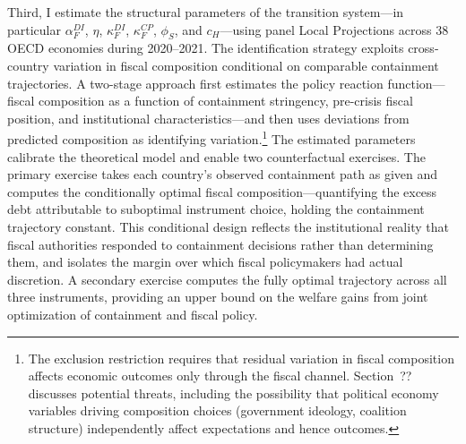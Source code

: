 Third, I estimate the structural parameters of the transition system---in particular
$\alpha_F^{DI}$, $\eta$, $\kappa_F^{DI}$, $\kappa_F^{CP}$, $\phi_S$, and
$c_H$---using panel Local Projections \citep{jorda2005, jorda2025} across 38 OECD
economies during 2020--2021. The identification strategy exploits cross-country
variation in fiscal composition conditional on comparable containment trajectories. A
two-stage approach first estimates the policy reaction function---fiscal composition
as a function of containment stringency, pre-crisis fiscal position, and institutional
characteristics---and then uses deviations from predicted composition as identifying
variation.\footnote{The exclusion restriction requires that residual variation in
fiscal composition affects economic outcomes only through the fiscal channel.
Section~?? discusses potential threats, including the possibility that political
economy variables driving composition choices (government ideology, coalition
structure) independently affect expectations and hence outcomes.} The estimated
parameters calibrate the theoretical model and enable two counterfactual exercises.
The primary exercise takes each country's observed containment path as given and
computes the conditionally optimal fiscal composition---quantifying the excess debt
attributable to suboptimal instrument choice, holding the containment trajectory
constant. This conditional design reflects the institutional reality that fiscal
authorities responded to containment decisions rather than determining them, and
isolates the margin over which fiscal policymakers had actual discretion. A secondary
exercise computes the fully optimal trajectory across all three instruments, providing
an upper bound on the welfare gains from joint optimization of containment and fiscal
policy.

